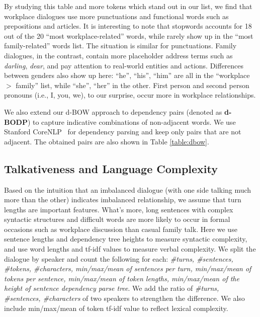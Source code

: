 By studying this table and more tokens which stand out in our list, 
we find that workplace dialogues use more punctuations and functional 
words such as prepositions and articles. 
It is interesting to note that stopwords accounts for 18 out of the 
20 ``most workplace-related'' words, while rarely show up in the ``most family-related'' words list. The situation is similar for punctuations.
Family dialogues, in the contrast, contain more placeholder address terms such as  \textit{darling}, \textit{dear}, and pay attention to real-world entities and actions. Differences between genders also show up here: ``he'', ``his'', ``him'' are all in the ``workplace $>$ family'' list, while ``she'', ``her'' in the other. First person and second person pronouns (i.e., I, you, we), 
to our surprise, occur more in workplace relationships. 

We also extend our d-BOW approach to dependency pairs 
(denoted as \textbf{d-BODP}) to capture indicative combinations of 
non-adjacent words. We use Stanford CoreNLP~\cite{stanfordcorenlp} 
for dependency parsing and keep only pairs that are not adjacent. 
The obtained pairs are also shown in Table \ref{table:dbow}.

\subsection*{Talkativeness and Language Complexity}
Based on the intuition that an imbalanced dialogue 
(with one side talking much more than the other) 
indicates imbalanced relationship, we assume that turn lengths are 
important features. What's more, long sentences with complex 
syntactic structures and difficult words are more 
likely to occur in formal occasions such as workplace discussion
than casual family talk. 
Here we use sentence lengths and dependency tree heights to measure 
syntactic complexity, 
and use word lengths and tf-idf values to measure verbal complexity. 
We split the dialogue by speaker and count the following for 
each: \textit{\#turns, \#sentences, \#tokens, \#characters, min/max/mean of sentences per turn, 
min/max/mean of tokens per sentence, min/max/mean of token lengths, min/max/mean of the 
height of sentence dependency parse tree}. We add the ratio of \textit{\#turns, \#sentences, \#characters} of two speakers to strengthen the difference. 
We also include min/max/mean of token tf-idf value to 
reflect lexical complexity.


